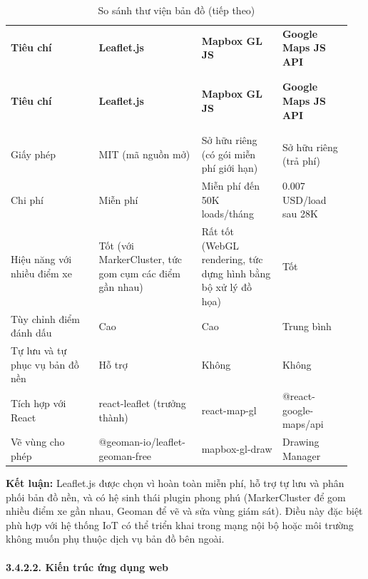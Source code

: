 \documentclass[a4paper]{extarticle}
\newcommand{\thesissettableid}[2]{%
  \renewcommand{\thetable}{#1}%
  \renewcommand{\theHtable}{#2}%
}
\begin{document}
{\thesissettableid{3.26}{tab-ch3-so-sanh-thu-vien-ban-o}
\def\LTcaptype{table}
\begin{longtable}{|L{0.248\linewidth}|L{0.285\linewidth}|L{0.229\linewidth}|L{0.192\linewidth}|}
\caption{So sánh thư viện bản đồ}\label{tab:ch3-so-sanh-thu-vien-ban-o}\\
\hline \textbf{Tiêu chí} & \textbf{Leaflet.js} & \textbf{Mapbox GL JS} & \textbf{Google Maps JS API} \\
\\\hline
\endfirsthead
\caption[]{So sánh thư viện bản đồ (tiếp theo)}\\
\hline \textbf{Tiêu chí} & \textbf{Leaflet.js} & \textbf{Mapbox GL JS} & \textbf{Google Maps JS API} \\
\\\hline
\endhead
\\\hline
\endfoot
\endlastfoot
Giấy phép & MIT (mã nguồn mở) & Sở hữu riêng (có gói miễn phí giới hạn) & Sở hữu riêng
(trả phí) \\\hline
Chi phí & Miễn phí & Miễn phí đến 50K loads/tháng & 0.007 USD/load sau
28K \\\hline
Hiệu năng với nhiều điểm xe & Tốt (với MarkerCluster, tức gom cụm các điểm gần nhau) & Rất tốt (WebGL
rendering, tức dựng hình bằng bộ xử lý đồ họa) & Tốt \\\hline
Tùy chỉnh điểm đánh dấu & Cao & Cao & Trung bình \\\hline
Tự lưu và tự phục vụ bản đồ nền & Hỗ trợ & Không & Không \\\hline
Tích hợp với React & react-leaflet (trưởng thành) & react-map-gl &
@react-google-maps/api \\\hline
Vẽ vùng cho phép & @geoman-io/leaflet-geoman-free & mapbox-gl-draw & Drawing
Manager \\\hline
\end{longtable}
}


\textbf{Kết luận:} Leaflet.js được chọn vì hoàn toàn miễn phí, hỗ trợ tự
lưu và phân phối bản đồ nền, và có hệ sinh thái plugin phong phú
(MarkerCluster để gom nhiều điểm xe gần nhau, Geoman để vẽ và sửa vùng giám sát).
Điều này đặc biệt phù hợp với hệ thống IoT có thể triển khai trong mạng
nội bộ hoặc môi trường không muốn phụ thuộc dịch vụ bản đồ bên ngoài.

\clearpage

\paragraph{3.4.2.2. Kiến trúc ứng dụng web}\label{3242-kiux1ebfn-truxfac-ux1ee9ng-dux1ee5ng-web-web-application-architecture}
\end{document}
